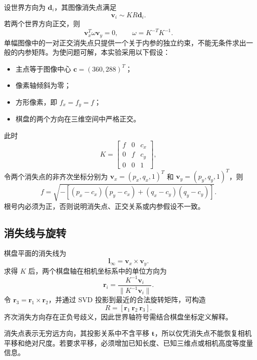 \documentclass[UTF8,a4paper,12pt]{ctexart}
\begin{document}
设世界方向为 $\bm d_i$，其图像消失点满足
\begin{equation}
  \bm v_i\sim KR\bm d_i.
\end{equation}
若两个世界方向正交，则
\begin{equation}
  \bm v_x^T\omega\bm v_y=0,
  \qquad \omega=K^{-T}K^{-1}.
\end{equation}
单幅图像中的一对正交消失点只提供一个关于内参的独立约束，不能无条件求出一般的内参矩阵。为使问题可解，本实验采用以下假设：
\begin{itemize}
  \item 主点等于图像中心 $\bm c=(360,288)^T$；
  \item 像素轴倾斜为零；
  \item 方形像素，即 $f_x=f_y=f$；
  \item 棋盘的两个方向在三维空间中严格正交。
\end{itemize}
此时
\begin{equation}
  K=\begin{bmatrix}
  f&0&c_x\\
  0&f&c_y\\
  0&0&1
  \end{bmatrix},
\end{equation}
令两个消失点的非齐次坐标分别为 $\bm v_x=(p_x,q_x,1)^T$ 和
$\bm v_y=(p_y,q_y,1)^T$，则
\begin{equation}
  f=\sqrt{-\left[(p_x-c_x)(p_y-c_x)+(q_x-c_y)(q_y-c_y)\right]}.
  \label{eq:focal}
\end{equation}
根号内必须为正，否则说明消失点、正交关系或内参假设不一致。

\subsection{消失线与旋转}

棋盘平面的消失线为
\begin{equation}
  \bm l_{\infty}=\bm v_x\times\bm v_y.
\end{equation}
求得 $K$ 后，两个棋盘轴在相机坐标系中的单位方向为
\begin{equation}
  \bm r_i=\frac{K^{-1}\bm v_i}{\lVert K^{-1}\bm v_i\rVert}.
\end{equation}
令 $\bm r_3=\bm r_1\times\bm r_2$，并通过 SVD 投影到最近的合法旋转矩阵，可构造
\begin{equation}
  R=[\bm r_1\ \bm r_2\ \bm r_3].
\end{equation}
齐次消失方向存在正负号歧义，因此世界轴符号需结合棋盘坐标定义解释。

消失点表示无穷远方向，其投影关系中不含平移 $\bm t$，所以仅凭消失点不能恢复相机平移和绝对尺度。若要求平移，必须增加已知长度、已知三维点或相机高度等度量信息。
\end{document}
